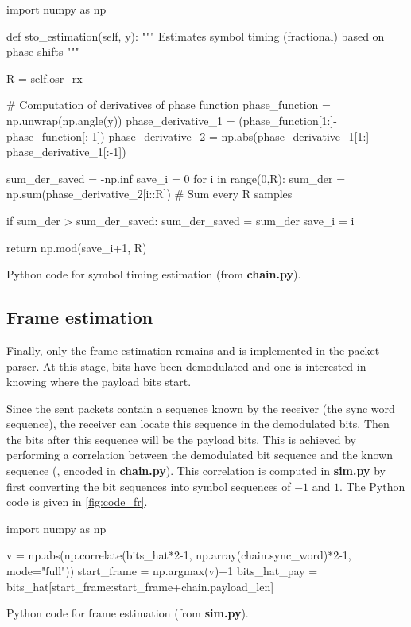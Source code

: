 \begin{listing}[H]
\begin{python}
import numpy as np

def sto_estimation(self, y):
    """
    Estimates symbol timing (fractional) based on phase shifts
    """

    R = self.osr_rx

    # Computation of derivatives of phase function
    phase_function = np.unwrap(np.angle(y))
    phase_derivative_1 = (phase_function[1:]-phase_function[:-1])
    phase_derivative_2 = np.abs(phase_derivative_1[1:]-phase_derivative_1[:-1])

    sum_der_saved = -np.inf
    save_i = 0
    for i in range(0,R):
        sum_der = np.sum(phase_derivative_2[i::R]) # Sum every R samples

        if sum_der > sum_der_saved:
            sum_der_saved = sum_der
            save_i = i

    return np.mod(save_i+1, R)

\end{python}
\caption{Python code for symbol timing estimation (from \textbf{chain.py}).}
\label{fig:code_symb}
\end{listing}


\subsection{Frame estimation}
Finally, only the frame estimation remains and is implemented in the packet parser. At this stage, bits have been demodulated and one is interested in knowing where the payload bits start.

Since the sent packets contain a sequence known by the receiver (the sync word sequence), the receiver can locate this sequence in the demodulated bits. Then the bits after this sequence will be the payload bits. This is achieved by performing a correlation between the demodulated bit sequence and the known sequence (, encoded in \textbf{chain.py}). This correlation is computed in \textbf{sim.py} by first converting the bit sequences into symbol sequences of $-1$ and $1$. The Python code is given in \autoref{fig:code_fr}.
\begin{listing}[H]
\begin{python}
import numpy as np

v = np.abs(np.correlate(bits_hat*2-1, np.array(chain.sync_word)*2-1, mode="full"))
start_frame = np.argmax(v)+1
bits_hat_pay = bits_hat[start_frame:start_frame+chain.payload_len]

\end{python}
\caption{Python code for frame estimation (from \textbf{sim.py}).}
\label{fig:code_fr}
\end{listing}

